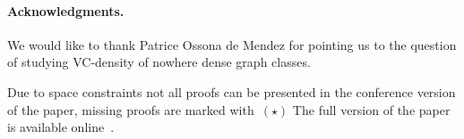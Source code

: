 \paragraph{Acknowledgments.} We would like to
thank Patrice Ossona de Mendez for pointing us to the
question of studying VC-density of nowhere dense graph
classes. 

Due to space constraints not all proofs can be 
presented in the conference version of the paper, 
missing proofs are marked with~$(\star)$ The full version 
of the paper is available online~\cite{l2017number}.


